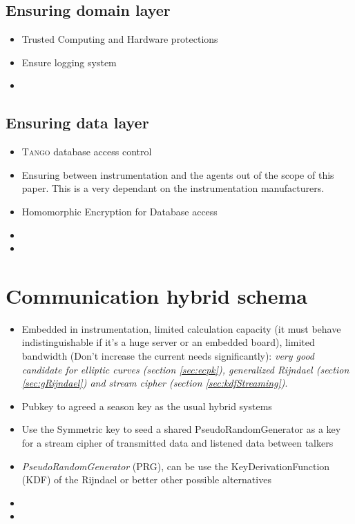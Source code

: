 \documentclass[10pt,a4paper,twoside]{llncs}
\newcommand{\tango}{\textsc{Tango} }
\begin{document}
%
\subsection{Ensuring domain layer \label{sec:domainLayer}}

\begin{itemize}
 \item Trusted Computing and Hardware protections
 \item Ensure logging system
 \item 
\end{itemize}

%
\subsection{Ensuring data layer \label{sec:dataLayer}}

\begin{itemize}
 \item \tango database access control
 \item Ensuring between instrumentation and the agents out of the scope of this paper. This is a very dependant on the instrumentation manufacturers.
 \item Homomorphic Encryption for Database access
 \item  
 \item 
\end{itemize}

%
\section{Communication hybrid schema \label{sec:intercom}}

\begin{itemize}
 \item Embedded in instrumentation, limited calculation capacity (it must behave indistinguishable if it's a huge server or an embedded board), limited bandwidth (Don't increase the current needs significantly): \emph{very good candidate for elliptic curves (section \ref{sec:ecpk}), generalized Rijndael (section \ref{sec:gRijndael}) and stream cipher (section \ref{sec:kdfStreaming})}.
 \item Pubkey to agreed a season key as the usual hybrid systems
 \item Use the Symmetric key to seed a shared PseudoRandomGenerator as a key for a stream cipher of transmitted data and listened data between talkers
 \item \emph{PseudoRandomGenerator} (PRG), can be use the KeyDerivationFunction (KDF) of the Rijndael or better other possible alternatives
 \item 
 \item 
\end{itemize}
\end{document}
